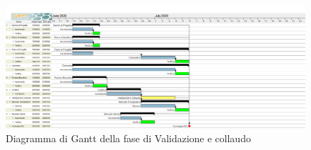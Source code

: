 \begin{figure}[H]
\centering
\includegraphics[scale=0.24]{./img/gantt/validazione_collaudo.png}
\caption{Diagramma di Gantt della fase di Validazione e collaudo}
\end{figure}